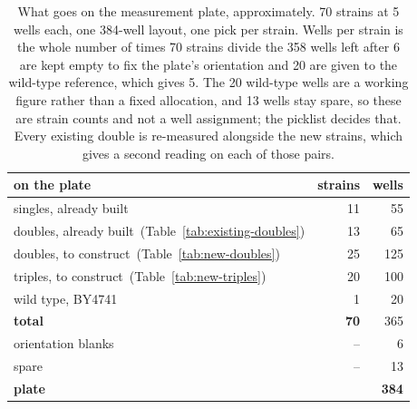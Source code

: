 \begin{table}[H]\centering
\small
\caption[]{What goes on the measurement plate, approximately. 70 strains at 5 wells each, one 384-well layout, one pick per strain. Wells per strain is the whole number of times 70 strains divide the 358 wells left after 6 are kept empty to fix the plate's orientation and 20 are given to the wild-type reference, which gives 5. The 20 wild-type wells are a working figure rather than a fixed allocation, and 13 wells stay spare, so these are strain counts and not a well assignment; the picklist decides that. Every existing double is re-measured alongside the new strains, which gives a second reading on each of those pairs.}\label{tab:plate}
\begin{tabular}{lrr}
\toprule
on the plate & strains & wells \\
\midrule
singles, already built & 11 & 55 \\
doubles, already built~(Table~\ref{tab:existing-doubles}) & 13 & 65 \\
doubles, to construct~(Table~\ref{tab:new-doubles}) & 25 & 125 \\
triples, to construct~(Table~\ref{tab:new-triples}) & 20 & 100 \\
wild type, BY4741 & 1 & 20 \\
\midrule
\textbf{total} & \textbf{70} & 365 \\
orientation blanks & -- & 6 \\
spare & -- & 13 \\
\midrule
\textbf{plate} &  & \textbf{384} \\
\bottomrule
\end{tabular}
\end{table}
